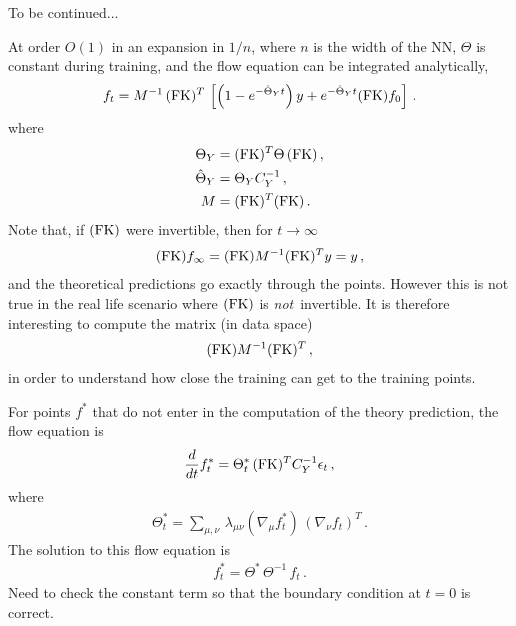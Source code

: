\documentclass[11pt]{article}
\begin{document}
To be continued... 

At order $O(1)$ in an expansion in $1/n$, where $n$ is the width of the NN, $\Theta$ is constant during training, and the flow equation can be integrated analytically, 
\begin{align}
    \label{eq:IntegrateFlowAtLeadingOrder}
    f_t = M^{-1}\, (\mathrm{FK})^T\, \left[
        \left(1 - e^{-\hat{\Theta}_Yt}\right) y +
        e^{-\hat{\Theta}_Y t} (\mathrm{FK}) f_0
    \right]\, .
\end{align}
where 
\begin{align}
    \label{eq:DefineThetaM}
    \Theta_Y &= (\mathrm{FK})^T \Theta\, (\mathrm{FK})\, , \\
    \hat{\Theta}_Y &= \Theta_Y C_Y^{-1}\, , \\    
    M &=  (\mathrm{FK})^T (\mathrm{FK})\, .
\end{align}
Note that, if $(\mathrm{FK})$ were invertible, then for $t\to\infty$
\begin{align}
    (\mathrm{FK}) f_\infty = (\mathrm{FK}) M^{-1} (\mathrm{FK})^T y = y\, ,
\end{align}
and the theoretical predictions go exactly through the points. However this is not true in the real life scenario where $(\mathrm{FK})$ is {\em not}\ invertible. It is therefore interesting to compute the matrix (in data space)
\begin{align}
    (\mathrm{FK}) M^{-1} (\mathrm{FK})^T \, ,    
\end{align}
in order to understand how close the training can get to the training points. 

For points $f^*$ that do not enter in the computation of the theory prediction, the flow 
equation is
\begin{align}
    \label{eq:FlowStarLinearDataNTK}
    \frac{d}{dt} f^*_t = 
        \Theta^*_t\, (\mathrm{FK})^T C_Y^{-1} \epsilon_t\, ,
\end{align}
where 
\begin{align}
    \label{eq:NTKStarDef}
    \Theta^*_t = \sum_{\mu,\nu}\, \lambda_{\mu\nu} \left(\nabla_\mu f^*_t\right)\, 
    \left(\nabla_\nu f_t\right)^T\, .
\end{align}
The solution to this flow equation is
\begin{align}
    \label{eq:IntegrateFlowAtLeadingOrderStar}
    f^*_t = \Theta^*\, \Theta^{-1}\, f_t \, . 
\end{align}
Need to check the constant term so that the boundary condition at $t=0$ is correct. 





\appendix

\end{document}
